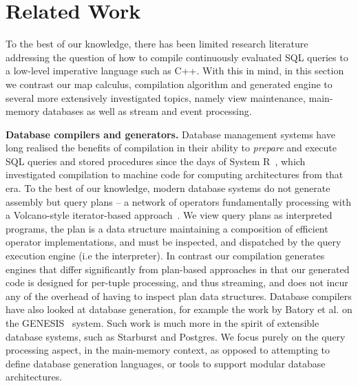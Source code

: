 \section{Related Work}

To the best of our knowledge, there has been limited research literature
addressing the question of how to compile continuously evaluated SQL queries to
a low-level imperative language such as C++.  With this in mind, in this section
we contrast our map calculus, compilation algorithm and generated engine to
several more extensively investigated topics, namely view maintenance,
main-memory databases as well as stream and event processing.

\textbf{Database compilers and generators.}
Database management systems have long realised the benefits of compilation in
their ability to \textit{prepare} and execute SQL queries and stored procedures
since the days of System R~\cite{chamberlin-tods:81}, which investigated
compilation to machine code for computing architectures from that era. To the
best of our knowledge, modern database systems do not generate assembly but
query plans -- a network of operators fundamentally processing with a
Volcano-style iterator-based approach~\cite{graefe-tkde:94}. We view query plans
as interpreted programs, the plan is a data structure maintaining a composition
of efficient operator implementations, and must be inspected, and dispatched by
the query execution engine (i.e the interpreter).
In contrast our compilation generates engines that differ
significantly from plan-based approaches in that our generated code is designed
for per-tuple processing, and thus streaming, and does not incur any of the
overhead of having to inspect plan data structures.
Database compilers have also looked at database generation, for example the work by Batory
et al. on the GENESIS~\cite{batory-tse:88} system. Such work is much more in the
spirit of extensible database systems, such as Starburst and Postgres. We focus
purely on the query processing aspect, in the main-memory context, as opposed to
attempting to define database generation languages, or tools to support modular
database architectures.


